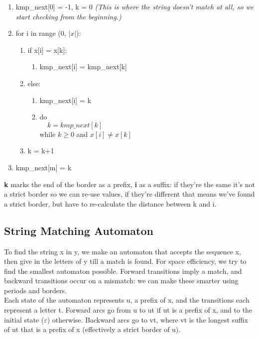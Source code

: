 \begin{enumerate}[label=\Alph*]
    \item kmp\_next[0] = -1, k = 0 \emph{(This is where the string doesn't match at all, so we start checking from the beginning.)}
    \item for i in range (0, $|x|$):
\begin{enumerate}[label=\arabic*]
    \item if x[i] = x[k]: 
    \begin{enumerate}
        \item kmp\_next[i] = kmp\_next[k] 
    \end{enumerate}
    \item else:
    \begin{enumerate}
        \item kmp\_next[i] = k
        \item do\\      
             $\; \; \; \; k = kmp\_next[k]$\\
             while $k\geq 0$ and $x[i]\neq x[k]$    
    \end{enumerate}
    \item k = k+1
\end{enumerate} 
\item kmp\_next[m] = k
\end{enumerate}
\textbf{k} marks the end of the border as a prefix, \textbf{i} as a suffix: if they're the same it's not a strict border so we can re-use values, if they're different that means we've found a strict border, but have to re-calculate the distance between k and i.

\subsection{String Matching Automaton}
To find the string x in y, we make an automaton that accepts the sequence x, then give in the letters of y till a match is found. For space efficiency, we try to find the smallest automaton possible. Forward transitions imply a match, and backward transitions occur on a mismatch: we can make these smarter using periods and borders. \\

Each state of the automaton represents u, a prefix of x, and the transitions each represent a letter t. Forward arcs go from u to ut if ut is a prefix of x, and to the initial state ($\varepsilon$) otherwise. Backward arcs go to vt, where vt is the longest suffix of ut that is a prefix of x (effectively a strict border of u).